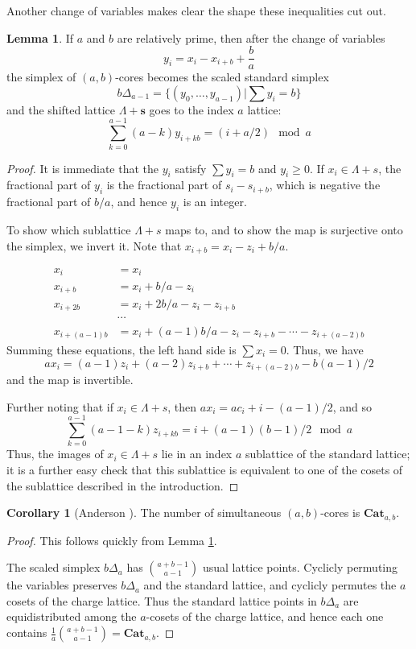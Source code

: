\documentclass{amsart}[12pt]
\theoremstyle{definition}
\newtheorem{lemma}[dummy]{Lemma}
\newtheorem{corollary}[dummy]{Corollary}
\newcommand{\Cat}{\mathbf{Cat}}
\begin{document}
Another change of variables makes clear the shape these inequalities cut out.
\begin{lemma} \label{lem-standardsimplex}
If $a$ and $b$ are relatively prime, then after the change of variables
$$y_{i}=x_{i}-x_{i+b}+\frac{b}{a}$$
the simplex of $(a,b)$-cores becomes the scaled standard simplex
$$b\Delta_{a-1}=\{(y_0,\dots, y_{a-1})\Big|\sum y_i=b\}$$
and the shifted lattice $\Lambda+\mathbf{s}$ goes to the index $a$ lattice:
$$\sum_{k=0}^{a-1} (a-k)y_{i+kb}=(i+a/2)\mod a$$
\end{lemma}

\begin{proof}
It is immediate that the $y_i$ satisfy $\sum y_i=b$ and $y_i\geq 0$.  If $x_i\in\Lambda+s$, the fractional part of $y_i$ is the fractional part of $s_i-s_{i+b}$, which is negative the fractional part of $b/a$, and hence $y_i$ is an integer.

To show which sublattice $\Lambda+s$ maps to, and to show the map is surjective onto the simplex, we invert it.  Note that $x_{i+b}=x_i-z_i+b/a$.

\begin{align*}
x_i&=x_i \\
x_{i+b}&=x_i+b/a-z_i \\
x_{i+2b}&=x_i+2b/a-z_i-z_{i+b} \\
&\cdots \\
x_{i+(a-1)b}&=x_i+(a-1)b/a-z_i-z_{i+b}-\cdots-z_{i+(a-2)b}
\end{align*}
Summing these equations, the left hand side is $\sum x_i=0$.  Thus, we have
$$ax_i=(a-1)z_i+(a-2)z_{i+b}+\cdots+z_{i+(a-2)b}-b(a-1)/2$$
and the map is invertible.

Further noting that if $x_i\in \Lambda+s$, then $ax_i=ac_i+i-(a-1)/2$, and so
$$\sum_{k=0}^{a-1} (a-1-k)z_{i+kb}=i+(a-1)(b-1)/2\mod a$$
Thus, the images of $x_i\in\Lambda+s$ lie in an index $a$ sublattice of the standard lattice; it is a further easy check that this sublattice is equivalent to one of the cosets of the sublattice described in the introduction.


\end{proof}


\begin{corollary}[Anderson \cite{anderson}] \label{cor:anderson} The
  number of simultaneous $(a,b)$-cores is $\Cat_{a,b}$.
\end{corollary}

\begin{proof} This follows quickly from Lemma \ref{lem-standardsimplex}.


The scaled simplex $b\Delta_a$ has $\binom{a+b-1}{a-1}$
  usual lattice points.  Cyclicly permuting the variables preserves
  $b\Delta_a$ and the standard lattice, and cyclicly permutes the $a$
  cosets of the charge lattice.   Thus the standard lattice points in
  $b\Delta_a$ are equidistributed among the $a$-cosets of the
  charge lattice, and hence each one contains $\frac{1}{a}\binom{a+b-1}{a-1}=\Cat_{a,b}$.


\end{proof}
\end{document}
